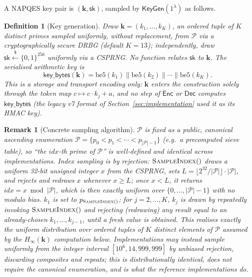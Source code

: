 \documentclass[11pt,a4paper]{article}
\newtheorem{definition}[theorem]{Definition}
\newtheorem{remark}[theorem]{Remark}
\begin{document}
A NAPQES key pair is $(\mathbf{k}, \mathsf{sk})$, sampled by
$\mathsf{KeyGen}(1^\lambda)$ as follows.

\begin{definition}[Key generation]\label{def:keygen}
Draw $\mathbf{k} = (k_1,\ldots,k_K)$, an ordered tuple of $K$ distinct
primes sampled uniformly, without replacement, from $\mathcal{P}$ via a
cryptographically secure DRBG (default $K=13$); \emph{independently}, draw
$\mathsf{sk}\xleftarrow{\$}\{0,1\}^{256}$ uniformly via a CSPRNG. No
function relates $\mathsf{sk}$ to $\mathbf{k}$. The serialised arithmetic
key is
\[
  \mathsf{key\_bytes}(\mathbf{k}) = \mathrm{be5}(k_1) \| \mathrm{be5}(k_2) \| \cdots \| \mathrm{be5}(k_K).
\]
This is a storage and transport encoding only: $\mathbf{k}$ enters the
construction solely through the token map $c\mapsto c\cdot k_j+a$, and no
step of $\mathsf{Enc}$ or $\mathsf{Dec}$ computes $\mathsf{key\_bytes}$ (the
legacy v7 format of Section~\ref{sec:implementation} used it as its HMAC
key).
\end{definition}

\begin{remark}[Concrete sampling algorithm]\label{rem:sampling}
$\mathcal{P}$ is fixed as a public, canonical ascending enumeration
$\mathcal{P}=\{p_0<p_1<\cdots<p_{|\mathcal{P}|-1}\}$ (e.g.\ a precomputed
sieve table), so ``the $idx$-th prime of $\mathcal{P}$'' is well-defined
and identical across implementations. Index sampling is by rejection:
$\textsc{SampleIndex}()$ draws a uniform 32-bit unsigned integer $x$ from
the CSPRNG, sets $L=\lfloor 2^{32}/|\mathcal{P}|\rfloor\cdot|\mathcal{P}|$,
and rejects and redraws $x$ whenever $x\geq L$; once $x<L$, it returns
$idx=x\bmod|\mathcal{P}|$, which is then exactly uniform over
$\{0,\ldots,|\mathcal{P}|-1\}$ with no modulo bias. $k_1$ is set to
$p_{\textsc{SampleIndex}()}$; for $j=2,\ldots,K$, $k_j$ is drawn by
repeatedly invoking $\textsc{SampleIndex}()$ and rejecting (redrawing) any
result equal to an already-chosen $k_1,\ldots,k_{j-1}$, until a fresh
value is obtained. This realises exactly the uniform distribution over
ordered tuples of $K$ distinct elements of $\mathcal{P}$ assumed by the
$H_\infty(\mathbf{k})$ computation below. Implementations may instead
sample uniformly from the integer interval $[10^6,14{,}999{,}999]$ by
unbiased rejection, discarding composites and repeats; this is
distributionally identical, does not require the canonical enumeration,
and is what the reference implementations do.
\end{remark}
\end{document}
